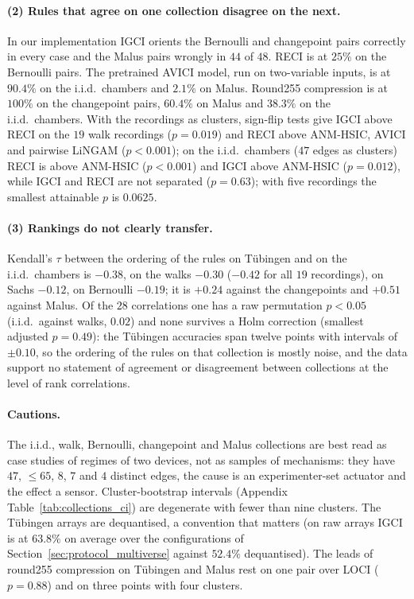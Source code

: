 \paragraph{(2) Rules that agree on one collection disagree on the next.} In our implementation IGCI orients the Bernoulli and changepoint pairs correctly in every case and the Malus pairs wrongly in $44$ of $48$. RECI is at $25\%$ on the Bernoulli pairs. The pretrained AVICI model, run on two-variable inputs, is at $90.4\%$ on the i.i.d.\ chambers and $2.1\%$ on Malus. Round255 compression is at $100\%$ on the changepoint pairs, $60.4\%$ on Malus and $38.3\%$ on the i.i.d.\ chambers. With the recordings as clusters, sign-flip tests give IGCI above RECI on the $19$ walk recordings ($p=0.019$) and RECI above ANM-HSIC, AVICI and pairwise LiNGAM ($p<0.001$); on the i.i.d.\ chambers ($47$ edges as clusters) RECI is above ANM-HSIC ($p<0.001$) and IGCI above ANM-HSIC ($p=0.012$), while IGCI and RECI are not separated ($p=0.63$); with five recordings the smallest attainable $p$ is $0.0625$.

\paragraph{(3) Rankings do not clearly transfer.} Kendall's $\tau$ between the ordering of the rules on T\"ubingen and on the i.i.d.\ chambers is $-0.38$, on the walks $-0.30$ ($-0.42$ for all $19$ recordings), on Sachs $-0.12$, on Bernoulli $-0.19$; it is $+0.24$ against the changepoints and $+0.51$ against Malus. Of the $28$ correlations one has a raw permutation $p<0.05$ (i.i.d.\ against walks, $0.02$) and none survives a Holm correction (smallest adjusted $p=0.49$): the T\"ubingen accuracies span twelve points with intervals of $\pm0.10$, so the ordering of the rules on that collection is mostly noise, and the data support no statement of agreement or disagreement between collections at the level of rank correlations.

\paragraph{Cautions.} The i.i.d., walk, Bernoulli, changepoint and Malus collections are best read as case studies of regimes of two devices, not as samples of mechanisms: they have $47$, $\le65$, $8$, $7$ and $4$ distinct edges, the cause is an experimenter-set actuator and the effect a sensor. Cluster-bootstrap intervals (Appendix Table~\ref{tab:collections_ci}) are degenerate with fewer than nine clusters. The T\"ubingen arrays are dequantised, a convention that matters (on raw arrays IGCI is at $63.8\%$ on average over the configurations of Section~\ref{sec:protocol_multiverse} against $52.4\%$ dequantised). The leads of round255 compression on T\"ubingen and Malus rest on one pair over LOCI ($p=0.88$) and on three points with four clusters.


